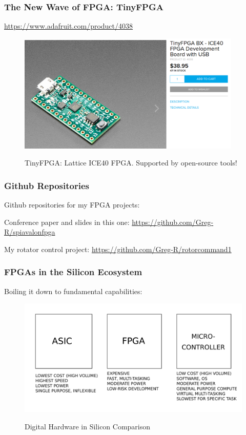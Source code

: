\documentclass{beamer}
\begin{document}
\begin{frame}
\frametitle{The New Wave of FPGA: TinyFPGA}

\url{https://www.adafruit.com/product/4038}

\begin{figure}[h]
	\centering
	\includegraphics[width=0.95\textwidth]{graphics/tinyfpga.png}
	\centering\bfseries
	\caption{TinyFPGA: Lattice ICE40 FPGA. Supported by open-source tools!}
\end{figure}


\end{frame}

\begin{frame}
\frametitle{Github Repositories}

Github repositories for my FPGA projects:

Conference paper and slides in this one:
\url{https://github.com/Greg-R/spiavalonfpga}

My rotator control project:
\url{https://github.com/Greg-R/rotorcommand1}

\end{frame}

\begin{frame}
\frametitle{FPGAs in the Silicon Ecosystem}

Boiling it down to fundamental capabilities:

\begin{figure}[h]
	\centering
	\includegraphics[width=1.0\textwidth]{graphics/asic_fpga_micro}
	\centering\bfseries
	\caption{Digital Hardware in Silicon Comparison}
\end{figure}

\end{frame}
\end{document}
